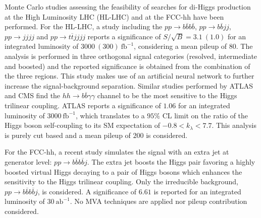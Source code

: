 Monte Carlo studies assessing the feasibility of searches for di-Higgs production at the High Luminosity LHC (HL-LHC) and at the FCC-hh have been performed. For the HL-LHC, a study including the $pp\rightarrow b\overline{b}b\overline{b}$, $pp\rightarrow b\overline{b}jj$, $pp\rightarrow jjjj$ and $pp\rightarrow t\overline{t}jjjj$ reports a significance of $S/\sqrt{B}=3.1~(1.0)$ for an integrated luminosity of $3000~(300)~\text{fb}^{-1}$, considering a mean pileup of $80$. The analysis is performed in three orthogonal signal categories (resolved, intermediate and boosted) and the reported significance is obtained from the combination of the three regions. This study makes use of an artificial neural network to further increase the signal-background separation. Similar studies performed by ATLAS and CMS find the $hh\rightarrow b\overline{b}\gamma\gamma$ channel to be the most sensitive to the Higgs trilinear coupling. ATLAS reports a significance of $1.06$ for an integrated luminosity of $3000~\text{fb}^{-1}$, which translates to a $95\%$ CL limit on the ratio of the Higgs boson self-coupling to its SM expectation of $-0.8<k_{\lambda}<7.7$. This analysis is purely cut based and a mean pileup of $200$ is considered. 

For the FCC-hh, a recent study simulates the signal with an extra jet at generator level: $pp\rightarrow b\overline{b}b\overline{b}j$. The extra jet boosts the Higgs pair favoring a highly boosted virtual Higgs decaying to a pair of Higgs bosons which enhances the sensitivity to the Higgs trilinear coupling. Only the irreducible background, $pp\rightarrow b\overline{b}b\overline{b}j$, is considered. A significance of $6.61$ is reported for an integrated luminosity of $30~\text{ab}^{-1}$. No MVA techniques are applied nor pileup contribution considered.

